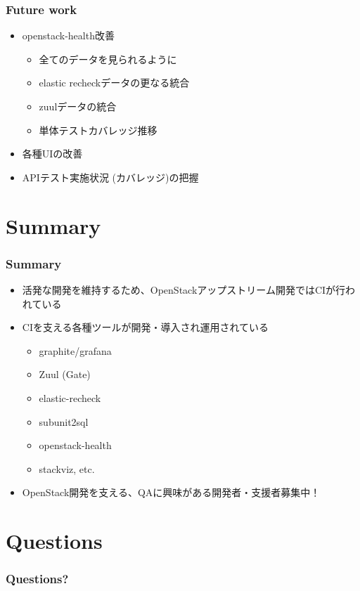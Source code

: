 \documentclass[aspectratio=169,11pt,hyperref={colorlinks=true}]{beamer}
\begin{document}
\begin{frame}
  \frametitle{Future work}
  \begin{itemize}
    \item openstack-health改善
    \begin{itemize}
      \item 全てのデータを見られるように
      \item elastic recheckデータの更なる統合
      \item zuulデータの統合
      \item 単体テストカバレッジ推移
    \end{itemize}
    \item 各種UIの改善
    \item APIテスト実施状況 (カバレッジ)の把握
  \end{itemize}
\end{frame}

\section{Summary}
\begin{frame}
  \frametitle{Summary}
  \begin{itemize}
    \item 活発な開発を維持するため、OpenStackアップストリーム開発ではCIが行われている
    \item CIを支える各種ツールが開発・導入され運用されている
    \begin{itemize}
      \item graphite/grafana
      \item Zuul (Gate)
      \item elastic-recheck
      \item subunit2sql
      \item openstack-health
      \item stackviz, etc.
    \end{itemize}
    \item OpenStack開発を支える、QAに興味がある開発者・支援者募集中！
  \end{itemize}
\end{frame}

\section{Questions}
\begin{frame}
  \frametitle{Questions?}
\end{frame}
\end{document}
